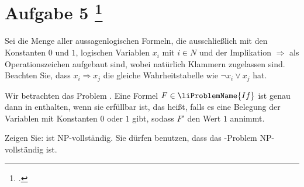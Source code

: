 \documentclass{lehramt-informatik-aufgabe}
\begin{document}
\section{Aufgabe 5
\footcite{examen:66115:2020:09}}

Sei  die Menge aller aussagenlogischen Formeln, die
ausschließlich mit den Konstanten $0$ und $1$, logischen Variablen $x_i$
mit $i \in N$ und der Implikation $\Rightarrow$ als Operationszeichen
aufgebaut sind, wobei natürlich Klammern zugelassen sind. Beachten Sie,
dass $x_i \Rightarrow x_j$ die gleiche Wahrheitstabelle wie $\neg x_i
\lor x_j$ hat.

Wir betrachten das Problem . Eine Formel $F \in
\liProblemName{If}$ ist genau dann in  enthalten,
wenn sie erfüllbar ist, das heißt, falls es eine Belegung der Variablen
mit Konstanten $0$ oder $1$ gibt, sodass $F'$ den Wert $1$ annimmt.

Zeigen Sie:  ist NP-vollständig. Sie dürfen
benutzen, dass das -Problem NP-vollständig ist.

\begin{liAntwort}

\end{liAntwort}
\end{document}
